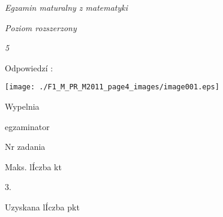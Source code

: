 \documentclass[a4paper,12pt]{article}
\begin{document}
{\it Egzamin maturalny z matematyki}

{\it Poziom rozszerzony}

{\it 5}

Odpowiedzí :
\begin{center}
\texttt{[image: ./F1\_M\_PR\_M2011\_page4\_images/image001.eps]}
\end{center}
Wypelnia

egzaminator

Nr zadania

Maks. lÍczba kt

3.

Uzyskana lÍczba pkt
\end{document}
